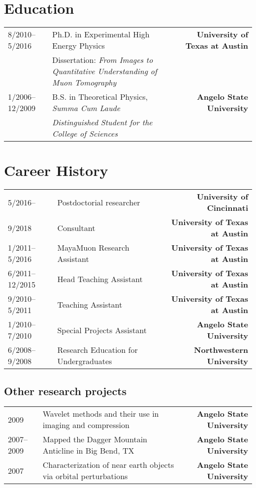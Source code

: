 \documentclass[10pt,letterpaper,english]{moderncv}
\begin{document}
\let\oldnullthing\null
\renewcommand{\null}{}
\makecvtitle
\renewcommand{\null}{\oldnullthing}
\vspace*{-10mm}

\section{Education}

\begin{tabularx}{\textwidth}{p{1.1in}X>{\bfseries}r}
	8/2010--5/2016 & Ph.D. in Experimental High Energy Physics &  University of Texas at Austin\\
	& Dissertation: \textit{From Images to Quantitative Understanding of Muon Tomography} & \\[.5ex]
	1/2006--12/2009 & B.S. in Theoretical Physics, \textit{Summa Cum Laude} & Angelo State University \\
	& \textit{Distinguished Student for the College of Sciences} & \\
\end{tabularx}

\section{Career History}

\begin{tabularx}{\textwidth}{p{1.1in}X>{\bfseries}r}
	5/2016-- & Postdoctorial researcher &  University of Cincinnati \\
	9/2018 & Consultant & University of Texas at Austin \\
	1/2011--5/2016 & MayaMuon Research Assistant & University of Texas at Austin \\
	6/2011--12/2015 & Head Teaching Assistant & University of Texas at Austin \\
	9/2010--5/2011 & Teaching Assistant & University of Texas at Austin \\
	1/2010--7/2010 & Special Projects Assistant & Angelo State University \\
	6/2008--9/2008 & Research Education for Undergraduates & Northwestern University \\
\end{tabularx}

\subsection{Other research projects}

\begin{tabularx}{\textwidth}{p{1.1in}X>{\bfseries}r}
	2009 & Wavelet methods and their use in imaging and compression &  Angelo State University \\
	2007--2009 & Mapped the Dagger Mountain Anticline in Big Bend, TX & Angelo State University \\
	2007 & Characterization of near earth objects via orbital perturbations & Angelo State University \\
\end{tabularx}
\end{document}
